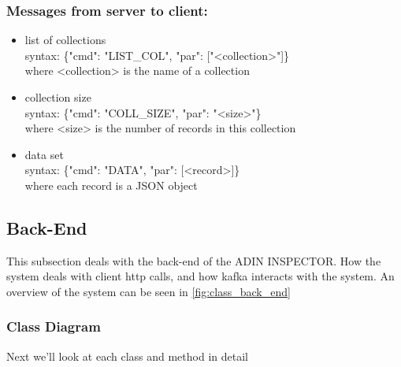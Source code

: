 \documentclass[oneside, english, final]{design}
\begin{document}
\subsubsection{Messages from server to client:}
\begin{itemize}
\item{list of collections}
\\
syntax: \{"cmd": "LIST\_COL", "par": ["<collection>"]\} \\
where <collection> is the name of a collection\\

\item{collection size}
\\
syntax: \{"cmd": "COLL\_SIZE", "par": "<size>"\} \\
where <size> is the number of records in this collection\\
\item{data set}
\\
syntax: \{"cmd": "DATA", "par": [<record>]\} \\
where each record is a JSON object
\end{itemize}

\subsection{Back-End}
This subsection deals with the back-end of the ADIN INSPECTOR. How the system deals with client http calls, and how kafka interacts with the system.
An overview of the system can be seen in \autoref{fig:class_back_end}

\subsubsection{Class Diagram}
Next we'll look at each class and method in detail
\end{document}
